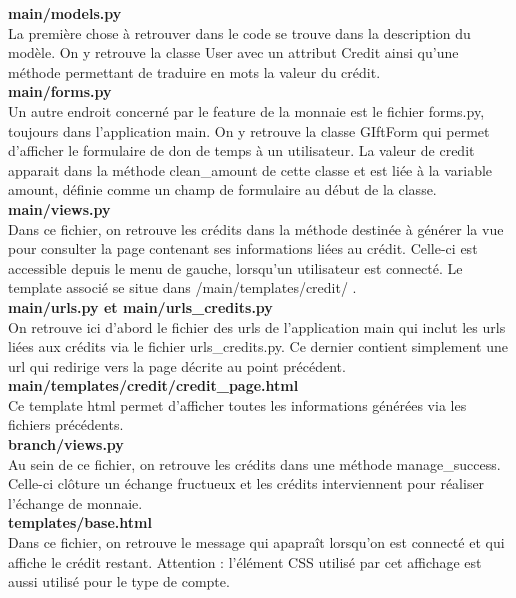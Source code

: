 \textbf{main/models.py}
\\%
La première chose à retrouver dans le code se trouve dans la description du modèle.  On y retrouve la classe User avec un attribut Credit ainsi qu'une méthode permettant de traduire en mots la valeur du crédit.
\\
\textbf{main/forms.py}
\\%
Un autre endroit concerné par le feature de la monnaie est le fichier forms.py,  toujours dans l'application main.  On y retrouve la classe GIftForm qui permet d'afficher le formulaire de don de temps à un utilisateur.  La valeur de credit apparait dans la méthode clean\_amount de cette classe et est liée à la variable amount,  définie comme un champ de formulaire au début de la classe.
\\
\textbf{main/views.py}
\\%
Dans ce fichier,  on retrouve les crédits dans la méthode destinée à générer la vue pour consulter la page contenant ses informations liées au crédit.  Celle-ci est accessible depuis le menu de gauche,  lorsqu'un utilisateur est connecté.  Le template associé se situe dans /main/templates/credit/ .
\\
\textbf{main/urls.py et main/urls\_credits.py}
\\%
On retrouve ici d'abord le fichier des urls de l'application main qui inclut les urls liées aux crédits via le fichier urls\_credits.py.  Ce dernier contient simplement une url qui redirige vers la page décrite au point précédent.
\\
\textbf{main/templates/credit/credit\_page.html}
\\%
Ce template html permet d'afficher toutes les informations générées via les fichiers précédents.
\\
\textbf{branch/views.py}
\\%
Au sein de ce fichier,   on retrouve les crédits dans une méthode manage\_success.  Celle-ci clôture un échange fructueux et les crédits interviennent pour réaliser l'échange de monnaie.  
\\
\textbf{templates/base.html}
\\%
Dans ce fichier,  on retrouve le message qui apapraît lorsqu'on est connecté et qui affiche le crédit restant.  Attention : l'élément CSS utilisé par cet affichage est aussi utilisé pour le type de compte.   
\\
